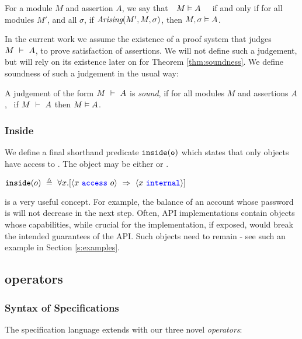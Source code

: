 \begin{definition}  
\label{def:mdl-sat}
For a module $M$ and assertion $A$, we say that\ \  $M \vDash A$ \ \ if and only if 
for all modules $M'$, and all $\sigma$, if $\textit{Arising}(M', M, \sigma)$, then $M , \sigma \vDash A$.
\end{definition}

 
In the current work we assume the existence of a proof system that judges
$M\ \vdash\ A$, to prove  satisfaction of assertions. 
 We will not define such a judgement, but will rely on its existence {later on for} Theorem \ref{thm:soundness}.
We define soundness of such a judgement in the usual way:

\begin{definition}
\label{ax:specW-prove-soundness}
A judgement of the form {$M\ \vdash\ A$} is \emph{sound}, if for all
 modules $M$ and assertions $A$, \ if $M\ \vdash\ A$ then $M \vDash A$.
\end{definition}

 
\subsubsection{Inside}

We define
a final shorthand 
predicate $\texttt{inside}( {\texttt{o}} )$ which states 
that only \internalO objects have access to .
The object  may be either \internalO or \externalO.
\begin{definition}[Inside]
$\wrapped{o}\ \triangleq\ \all{x}{\access{x}{o}\ \Rightarrow\ \internal{x}} $ 
\end{definition}

 
\inside is a very useful concept. For example, the balance of an account whose
  password is \inside  will not decrease in the next step.
  Often, API implementations contain objects whose capabilities, while  crucial for the implementation, if exposed,
would break the intended guarantees of the API. Such objects need to remain \inside - see
such an example in Section \ref{s:examples}. 
 


\subsection {\Nec operators}
\label{s:holistic-guarantees}

\subsubsection{Syntax of \Nec Specifications}
The \Nec specification language extends \SpecO with our three novel 
 \jm[]{\Nec} \emph{operators}:

